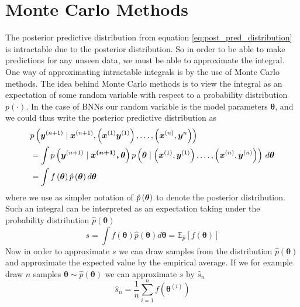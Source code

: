 \section{Monte Carlo Methods}\label{sec:MC_methods}
The posterior predictive distribution from equation \ref{eq:post_pred_distribution} is intractable due to the posterior distribution. So in order to be able to make predictions for any unseen data, we must be able to approximate the integral. One way of approximating intractable integrals is by the use of Monte Carlo methods. The idea behind Monte Carlo methods is to view the integral as an expectation of some random variable with respect to a probability distribution $p(\cdot)$. In the case of BNNs our random variable is the model parameters $\boldsymbol{\theta}$, and we could thus write the posterior predictive distribution as
\begin{equation}
    \begin{split}
        &p\left(\boldsymbol{y}^{(n+1)} \mid \boldsymbol{x}^{(n+1)}, \left (\boldsymbol{x}^{(1)}\boldsymbol{y}^{(1)}\right), \ldots, \left (\boldsymbol{x}^{(n)}, \boldsymbol{y}^{n}\right)\right)\\
        &=\int p\left(\boldsymbol{y}^{(n+1)} \mid \boldsymbol{\boldsymbol{x}^{(n+1)}, \theta}\right) p \left (\boldsymbol{\theta} \mid \left (\boldsymbol{x}^{(1)}, \boldsymbol{y}^{(1)}\right), \ldots, \left (\boldsymbol{x}^{(n)}, \boldsymbol{y}^{(n)}\right)\right) \, d \boldsymbol{\theta}\\
        &=\int f\left (\boldsymbol{\theta}\right)\hat{p}\left (\boldsymbol{\theta}\right) d\boldsymbol{\theta}
    \end{split}
\end{equation}
where we use as simpler notation of $\hat{p}\left (\boldsymbol{\theta}\right)$ to denote the posterior distribution. Such an integral can be interpreted as an expectation taking under the probability distribution $\hat{p}(\boldsymbol{\theta})$ 
\begin{equation*}
    s=\int f(\boldsymbol{\theta})\hat{p}(\boldsymbol{\theta})  d \boldsymbol{\theta}=\mathbb{E}_{\hat{p}}[f(\boldsymbol{\theta})]
\end{equation*}
Now in order to approximate $s$ we can draw samples from the distribution $\hat{p}(\boldsymbol{\theta}) $ and approximate the expected value by the empirical average. If we for example draw $n$ samples $\boldsymbol{\theta}\sim \hat{p}(\boldsymbol{\theta})$ we can approximate $s$ by $\hat{s}_n$
\begin{equation}\label{eq:empirical_mean_MC}
        \hat{s}_{n}=\frac{1}{n} \sum_{i=1}^{n} f\left(\boldsymbol{\theta}^{(i)}\right)
\end{equation}
